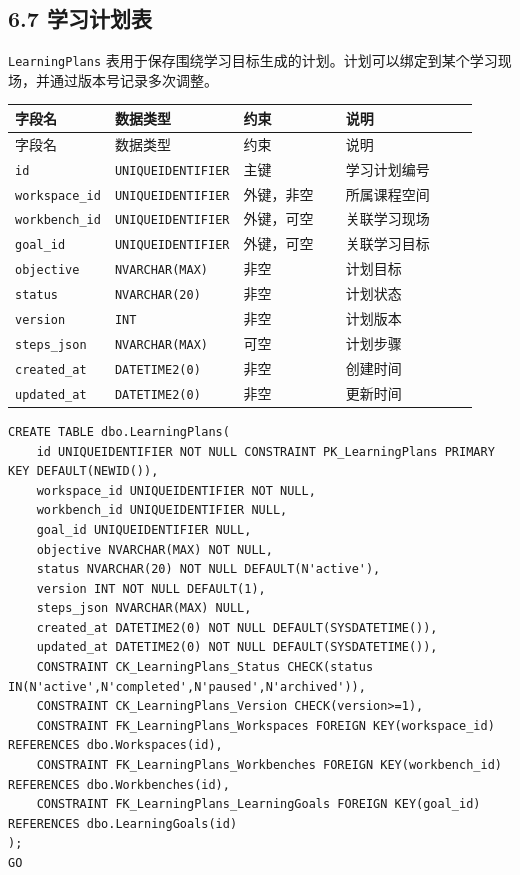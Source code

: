 \documentclass[10pt,a4paper,fontset=none]{ctexart}
\begin{document}
\subsection*{6.7 学习计划表}

\texttt{LearningPlans} 表用于保存围绕学习目标生成的计划。计划可以绑定到某个学习现场，并通过版本号记录多次调整。\par

\begingroup\scriptsize
\renewcommand{\arraystretch}{1.18}
\setlength{\LTleft}{0pt}
\setlength{\LTright}{0pt}
\begin{longtable}{>{\raggedright\arraybackslash}p{0.20\linewidth}>{\raggedright\arraybackslash}p{0.16\linewidth}>{\raggedright\arraybackslash}p{0.24\linewidth}>{\raggedright\arraybackslash}p{0.32\linewidth}}
\toprule
字段名 & 数据类型 & 约束 & 说明 \\
\midrule
\endfirsthead
\toprule
字段名 & 数据类型 & 约束 & 说明 \\
\midrule
\endhead
\texttt{id} & \texttt{UNIQUEIDENTIFIER} & 主键 & 学习计划编号 \\
\texttt{workspace\_id} & \texttt{UNIQUEIDENTIFIER} & 外键，非空 & 所属课程空间 \\
\texttt{workbench\_id} & \texttt{UNIQUEIDENTIFIER} & 外键，可空 & 关联学习现场 \\
\texttt{goal\_id} & \texttt{UNIQUEIDENTIFIER} & 外键，可空 & 关联学习目标 \\
\texttt{objective} & \texttt{NVARCHAR(MAX)} & 非空 & 计划目标 \\
\texttt{status} & \texttt{NVARCHAR(20)} & 非空 & 计划状态 \\
\texttt{version} & \texttt{INT} & 非空 & 计划版本 \\
\texttt{steps\_json} & \texttt{NVARCHAR(MAX)} & 可空 & 计划步骤 \\
\texttt{created\_at} & \texttt{DATETIME2(0)} & 非空 & 创建时间 \\
\texttt{updated\_at} & \texttt{DATETIME2(0)} & 非空 & 更新时间 \\
\bottomrule
\end{longtable}
\endgroup


\begin{Verbatim}[fontsize=\scriptsize,frame=single]
CREATE TABLE dbo.LearningPlans(
    id UNIQUEIDENTIFIER NOT NULL CONSTRAINT PK_LearningPlans PRIMARY KEY DEFAULT(NEWID()),
    workspace_id UNIQUEIDENTIFIER NOT NULL,
    workbench_id UNIQUEIDENTIFIER NULL,
    goal_id UNIQUEIDENTIFIER NULL,
    objective NVARCHAR(MAX) NOT NULL,
    status NVARCHAR(20) NOT NULL DEFAULT(N'active'),
    version INT NOT NULL DEFAULT(1),
    steps_json NVARCHAR(MAX) NULL,
    created_at DATETIME2(0) NOT NULL DEFAULT(SYSDATETIME()),
    updated_at DATETIME2(0) NOT NULL DEFAULT(SYSDATETIME()),
    CONSTRAINT CK_LearningPlans_Status CHECK(status IN(N'active',N'completed',N'paused',N'archived')),
    CONSTRAINT CK_LearningPlans_Version CHECK(version>=1),
    CONSTRAINT FK_LearningPlans_Workspaces FOREIGN KEY(workspace_id) REFERENCES dbo.Workspaces(id),
    CONSTRAINT FK_LearningPlans_Workbenches FOREIGN KEY(workbench_id) REFERENCES dbo.Workbenches(id),
    CONSTRAINT FK_LearningPlans_LearningGoals FOREIGN KEY(goal_id) REFERENCES dbo.LearningGoals(id)
);
GO
\end{Verbatim}
\end{document}
